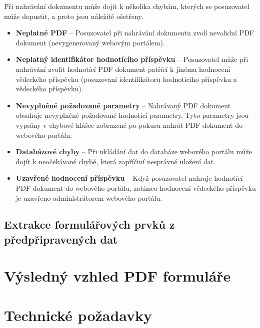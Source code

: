 \par
Při nahrávání dokumentu může dojít k několika chybám, kterých se posuzovatel může dopustit, a proto jsou náležitě ošetřeny.
\begin{itemize}
	\item \textbf{Neplatné PDF} -- Posuzovatel při nahrávání dokumentu zvolí nevalidní PDF dokument (nevygenerovaný webovým portálem).
	\item \textbf{Neplatný identifikátor hodnotícího příspěvku} -- Posuzovatel může při nahrávání zvolit hodnotící PDF dokument patřící k jinému hodnocení vědeckého příspěvku (posuzovaní identifikátoru hodnotícího příspěvku a vědeckého příspěvku).
	\item \textbf{Nevyplněné požadované parametry} -- Nahrávaný PDF dokument obsahuje nevyplněné požadované hodnotící parametry. Tyto parametry jsou vypsány v chybové hlášce zobrazené po pokusu nahrát PDF dokument do webového portálu.
	\item \textbf{Databázové chyby} -- Při ukládání dat do databáze webového portálu může dojít k neočekávané chybě, která zapříčiní nesprávné uložení dat. 
	\item \textbf{Uzavřené hodnocení příspěvku} -- Když posuzovatel nahraje hodnotící PDF dokument do webového portálu, zatímco hodnocení vědeckého příspěvku je uzavřeno administrátorem webového portálu.
\end{itemize}

\subsection{Extrakce formulářových prvků z předpřipravených dat}


\section{Výsledný vzhled PDF formuláře}

\section{Technické požadavky}

